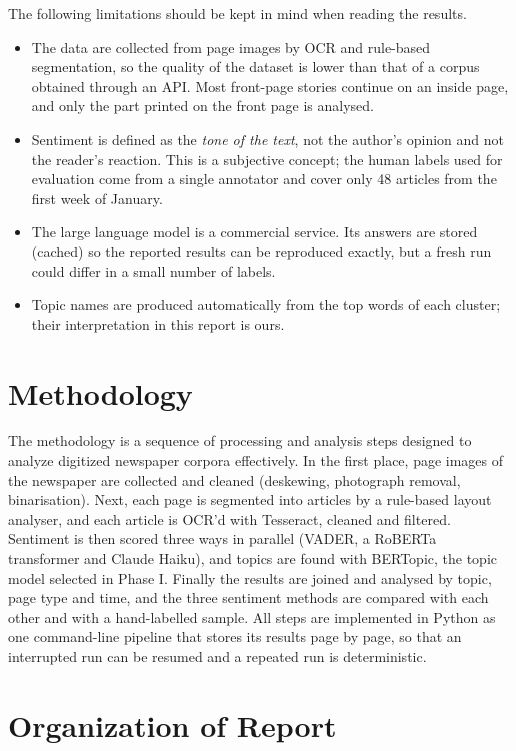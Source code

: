 The following limitations should be kept in mind when reading the results.
\begin{itemize}
\item The data are collected from page images by OCR and rule-based segmentation, so the quality of the dataset is lower than that of a corpus obtained through an API. Most front-page stories continue on an inside page, and only the part printed on the front page is analysed.
\item Sentiment is defined as the \emph{tone of the text}, not the author's opinion and not the reader's reaction. This is a subjective concept; the human labels used for evaluation come from a single annotator and cover only 48 articles from the first week of January.
\item The large language model is a commercial service. Its answers are stored (cached) so the reported results can be reproduced exactly, but a fresh run could differ in a small number of labels.
\item Topic names are produced automatically from the top words of each cluster; their interpretation in this report is ours.
\end{itemize}

\section{Methodology}

The methodology is a sequence of processing and analysis steps designed to analyze digitized newspaper corpora effectively. In the first place, page images of the newspaper are collected and cleaned (deskewing, photograph removal, binarisation). Next, each page is segmented into articles by a rule-based layout analyser, and each article is OCR'd with Tesseract, cleaned and filtered. Sentiment is then scored three ways in parallel (VADER, a RoBERTa transformer and Claude Haiku), and topics are found with BERTopic, the topic model selected in Phase I. Finally the results are joined and analysed by topic, page type and time, and the three sentiment methods are compared with each other and with a hand-labelled sample. All steps are implemented in Python as one command-line pipeline that stores its results page by page, so that an interrupted run can be resumed and a repeated run is deterministic.

\section{Organization of Report}

